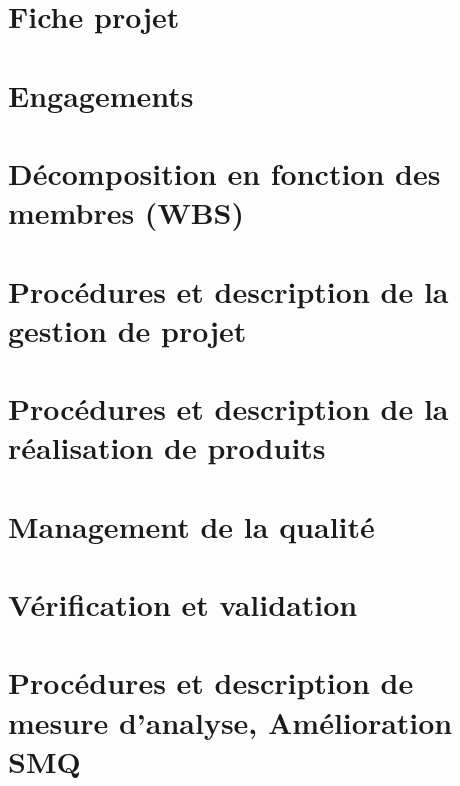 \documentclass[asi]{picInsa}
\title{\PQ{}}
\author{\Pierre}
\begin{document}
\couverture{}

 \informationsGenerales{}


\tableofcontents

\setcounter{chapter}{0}
 
\chapter{Fiche projet}
\label{fiche_projet}


\chapter{Engagements}
\label{egagements}


\chapter{Décomposition en fonction des membres (WBS)}
\label{decomposition_membre_WBS}


\chapter{Procédures et description de la gestion de projet}
\label{gestion_projet}


\chapter{Procédures et description de la réalisation de produits}
\label{realiser_les_produits}


\chapter{Management de la qualité}
\label{management_de_la_qualite}

 
\chapter{Vérification et validation}
\label{verification_et_validation}


\chapter{Procédures et description de mesure d'analyse, Amélioration SMQ}
\label{mesure_analyse_amelioration_SMQ}

\end{document}
